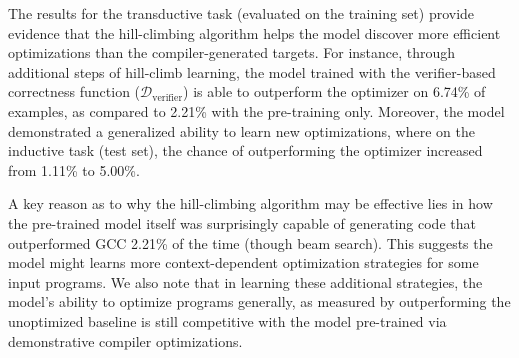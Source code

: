 \documentclass{article}
\def\correctfuncsmt/{\ensuremath{\mathcal{D}_\textrm{verifier}}}
\begin{document}
The results for the transductive task (evaluated on the training set) provide evidence that the hill-climbing algorithm helps the model discover more efficient optimizations than the compiler-generated targets. 
For instance, through additional steps of hill-climb learning, the model trained with the verifier-based correctness function ($\correctfuncsmt/$) is able to outperform the optimizer on 6.74\% of examples, as compared to 2.21\% with the pre-training only.
Moreover, the model demonstrated a generalized ability to learn new optimizations, where on the inductive task (test set), the chance of outperforming the optimizer increased from 1.11\% to 5.00\%. 

A key reason as to why the hill-climbing algorithm may be effective lies in how the pre-trained model itself was surprisingly capable of generating code that outperformed GCC 2.21\% of the time (though beam search). 
This suggests the model might learns more context-dependent optimization strategies for some input programs.
We also note that in learning these additional strategies, the model's ability to optimize programs generally, as measured by outperforming the unoptimized baseline is still competitive with the model pre-trained via demonstrative compiler optimizations. 
\end{document}
